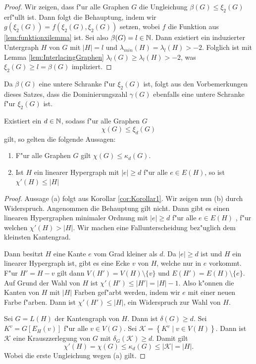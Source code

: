 \begin{proof}
  Wir zeigen, dass f"ur alle Graphen $G$ die Ungleichung $\beta(G) \leq \xi_{2}(G) $ erf"ullt ist. Dann folgt die Behauptung, indem wir $g(\xi_2(G))=f(\xi_2(G),\xi_2(G))$ setzen, wobei $f$ die Funktion aus \ref{lem:funktionxilemma} ist. Sei also $\beta(G) = l \in {\mathbb{N}}$. Dann existiert ein induzierter Untergraph $H$ von $G$ mit $|H| = l$ und $\lambda_{min}(H) = \lambda_{l}(H) > -2$. Folglich ist mit Lemma \ref{lem:InterlacingGraphen} $\lambda_l (G) \geq \lambda_{l}(H) > -2$, was $\xi_2(G) \geq l = \beta(G)$ impliziert.
\end{proof}
Da $\beta(G)$ eine untere Schranke f"ur $\xi_{2}(G)$ ist, folgt aus den Vorbemerkungen dieses Satzes, dass die Dominierungszahl $\gamma(G)$ ebenfalls eine untere Schranke f"ur $\xi_{2}(G)$ ist. 
\begin{theorem}
  \label{thm:MainTheorem}
  Existiert ein $d\in {\mathbb{N}}$, sodass f"ur alle  Graphen $G$ $$\chi(G) \leq \xi_{d}(G)$$ gilt, so gelten die folgende Aussagen:
  \begin{enumerate}[label=\rm{(\alph*)}]
    \item F"ur alle Graphen $G$ gilt $\chi(G) \leq \kappa_d (G)$.
    \item  Ist $H$ ein linearer Hypergraph mit $\left|e\right| \geq d$ f"ur alle $e\in E(H)$, so ist $\chi'\left( H \right)\leq \left|H\right| $
  \end{enumerate}
\end{theorem}

\begin{proof}
  Aussage (a) folgt aus Korollar \ref{cor:Korollar1}.  
  Wir zeigen nun (b) durch Widerspruch. Angenommen die Behauptung gilt nicht. Dann gibt es einen linearen Hypergraphen minimaler Ordnung mit $|e| \geq d$ f"ur alle $e\in E(H)$ , f"ur welchen $\chi'(H) > |H|$. 
  Wir machen eine Fallunterscheidung bez"uglich dem kleinsten Kantengrad.

   Dann besitzt $H$ eine Kante $e$ vom Grad kleiner als $d$. Da $|e| \geq d$ ist und $H$ ein linearer Hypergraph ist, gibt es eine Ecke $v$ von $H$, welche nur in $e$ vorkommt.
  F"ur $H' = H-v$ gilt dann $V(H') = V(H) \setminus \{v\}$ und $E(H') = E(H) \setminus \{e\}$. Auf Grund der Wahl von $H$ ist $\chi'(H') \leq |H'| = |H|-1$. Also k"onnen die Kanten von $H$ mit $|H|$ Farben gef"arbt werden, indem wir $e$ mit einer neuen Farbe f"arben. 
  Dann ist $\chi'(H') \leq |H|$, ein Widerspruch zur Wahl von $H$. 

   Sei $G=L(H)$ der Kantengraph von $H$. Dann ist $\delta(G) \geq d$. 
  Sei $K^{v} = G[E_{H}(v)]$ f"ur alle $v\in V(G)$. Sei $\mathcal{K}=\left\{ K^{v} \;|\; v \in V(H) \right\}$. 
  Dann ist $\mathcal{K}$ eine Krauszzerlegung von $G$ mit $\delta_{G}(\mathcal{K}) \geq d$. Damit gilt
  \begin{equation*}
    \chi'(H) = \chi(G) \leq \kappa_{d}(G) \leq |\mathcal{K}| = |H|.
  \end{equation*}
  Wobei die erste Ungleichung wegen (a) gilt. 
\end{proof}

